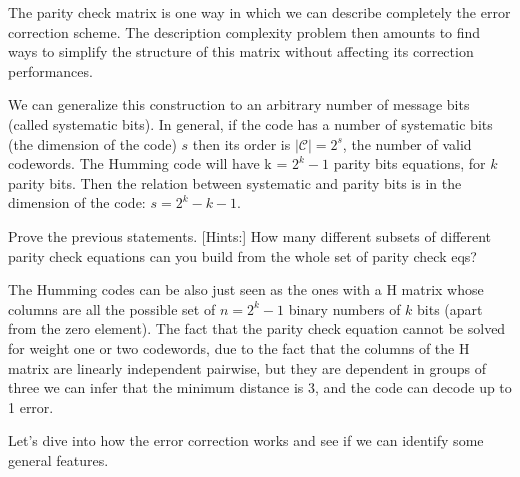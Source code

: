 The parity check matrix is one way in which we can describe completely the error correction scheme. The description complexity problem then amounts to find ways to simplify the structure of this matrix without affecting its correction performances. 


We can generalize this construction to an arbitrary number of message bits (called systematic bits). In general, if the code has a number of systematic bits (the dimension of the code) $s$ then its order is $|\mathcal{C}| = 2^{s}$, the number of valid codewords. The Humming code will have k = $ 2^k -1 $ parity bits equations, for $k$ parity bits. Then the relation between systematic and parity bits is in the dimension of the code: $s = 2^{k} - k - 1$. 

\begin{example}
	Prove the previous statements. 
	[Hints:] How many different subsets of different parity check equations can you build from the whole set of parity check eqs? 
\end{example}

The Humming codes can be also just seen as the ones with a H matrix whose columns are all the possible set of $n = 2^k-1$ binary numbers of $k$ bits (apart from the zero element). The fact that the parity check equation cannot be solved for weight one or two codewords, due to the fact that the columns of the H matrix are linearly independent pairwise, but they are dependent in groups of three we can infer that the minimum distance is 3, and the code can decode up to 1 error.


Let's dive into how the error correction works and see if we can identify some general features.

